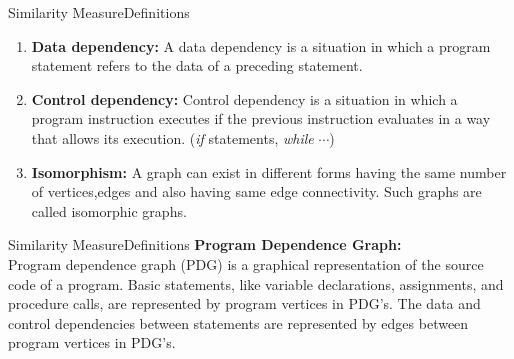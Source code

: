 \documentclass{beamer}
\begin{document}
\begin{frame}{Similarity Measure}{Definitions}
    \begin{enumerate}
        \item \textbf{Data dependency:} A data dependency is a situation in which a program statement refers to the data of a preceding statement.\\
        \item \textbf{Control dependency:} Control dependency is a situation in which a program instruction executes if the previous instruction evaluates in a way that allows its execution. (\textit{if} statements, \textit{while} $\cdots$)\\
        \item \textbf{Isomorphism:} A graph can exist in different forms having the same number of vertices,edges and
also having same edge connectivity. Such graphs are called isomorphic graphs.\\
    \end{enumerate}
    
\end{frame}

\begin{frame}{Similarity Measure}{Definitions}
    \textbf{Program Dependence Graph:}\\ Program dependence graph (PDG) is a graphical representation of the source code of a program. Basic statements, like variable declarations, assignments, and procedure calls, are represented by program vertices in PDG’s. The data and control
dependencies between statements are represented by edges between program vertices
in PDG’s.\\

\end{frame}
\end{document}
